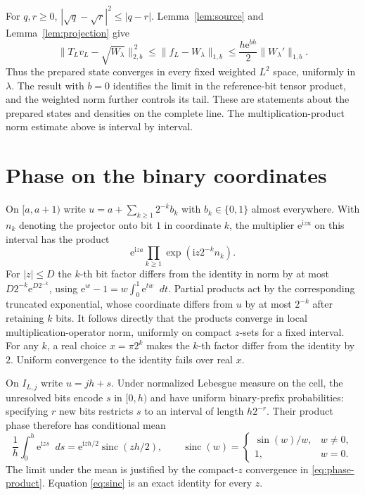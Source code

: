 \documentclass[11pt]{article}
\DeclareMathOperator{\sinc}{sinc}
\newcommand{\dd}{\mathop{}\!d}
\newcommand{\ee}{\mathrm e}
\newcommand{\ii}{\mathrm i}
\newcommand{\norm}[1]{\lVert#1\rVert}
\begin{document}
For \(q,r\ge0\), \(|\sqrt q-\sqrt r|^2\le |q-r|\).
Lemma~\ref{lem:source} and Lemma~\ref{lem:projection} give
\begin{equation}\label{eq:state-limit}
 \norm{T_L v_L-\sqrt{W_\lambda}}_{2,b}^{\,2}
 \le \norm{f_L-W_\lambda}_{1,b}
 \le \frac{h\ee^{bh}}2\norm{W_\lambda'}_{1,b}.
\end{equation}
Thus the prepared state converges in every fixed weighted
\(L^2\) space, uniformly in \(\lambda\). The result with \(b=0\)
identifies the limit in the reference-bit tensor product, and
the weighted norm further controls its tail. These are statements
about the prepared states and densities on the complete line.
The multiplication-product norm estimate above is interval by
interval.

\section{Phase on the binary coordinates}\label{sec:readout}

On \([a,a+1)\) write \(u=a+\sum_{k\ge1}2^{-k}b_k\) with
\(b_k\in\{0,1\}\) almost everywhere. With \(n_k\) denoting the
projector onto bit \(1\) in coordinate \(k\), the multiplier
\(\ee^{\ii zu}\) on this interval has the product
\begin{equation}\label{eq:phase-product}
 \ee^{\ii za}\prod_{k\ge1}\exp(\ii z 2^{-k}n_k).
\end{equation}
For \(|z|\le D\) the \(k\)-th bit factor differs from the identity
in norm by at most \(D2^{-k}\ee^{D2^{-k}}\), using
\(\ee^w-1=w\int_0^1\ee^{tw}\dd t\). Partial products act by
the corresponding truncated exponential, whose coordinate differs
from \(u\) by at most \(2^{-k}\) after retaining \(k\) bits.
It follows directly that the products converge in local
multiplication-operator norm, uniformly on compact \(z\)-sets
for a fixed interval. For any \(k\), a real choice \(x=\pi2^k\)
makes the \(k\)-th factor differ from the identity by \(2\).
Uniform convergence to the identity fails over real \(x\).

On \(I_{L,j}\) write \(u=jh+s\). Under normalized Lebesgue
measure on the cell, the unresolved bits encode \(s\) in
\([0,h)\) and have uniform binary-prefix probabilities: specifying
\(r\) new bits restricts \(s\) to an interval of length \(h2^{-r}\).
Their product phase therefore has conditional mean
\begin{equation}\label{eq:sinc}
 \frac1h\int_0^h \ee^{\ii zs}\dd s
   =\ee^{\ii zh/2}\sinc(zh/2),\qquad
 \sinc(w)=\begin{cases}\sin(w)/w,&w\ne0,\\1,&w=0.\end{cases}
\end{equation}
The limit under the mean is justified by the compact-\(z\) convergence
in \eqref{eq:phase-product}. Equation \eqref{eq:sinc} is an exact
identity for every \(z\).
\end{document}
